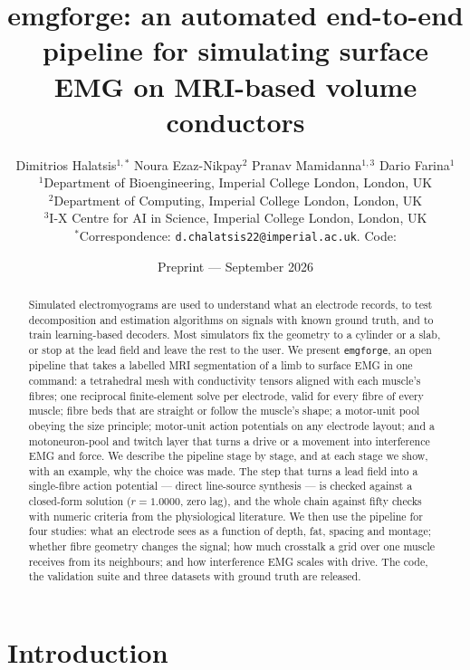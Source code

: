 \documentclass[11pt,a4paper]{article}
\title{\textbf{emgforge}: an automated end-to-end pipeline for simulating surface EMG on MRI-based volume conductors}
\author{Dimitrios Halatsis$^{1,*}$ \quad Noura Ezaz-Nikpay$^{2}$ \quad Pranav Mamidanna$^{1,3}$ \quad Dario Farina$^{1}$\\[6pt]
  \small $^{1}$Department of Bioengineering, Imperial College London, London, UK\\
  \small $^{2}$Department of Computing, Imperial College London, London, UK\\
  \small $^{3}$I-X Centre for AI in Science, Imperial College London, London, UK\\[4pt]
  \small $^{*}$Correspondence: \texttt{d.chalatsis22@imperial.ac.uk}. Code: \repo}
\date{Preprint --- September 2026}
\newcommand{\emgforge}{\texttt{emgforge}}
\begin{document}
\maketitle

\begin{abstract}
Simulated electromyograms are used to understand what an electrode records, to test
decomposition and estimation algorithms on signals with known ground truth, and to train
learning-based decoders. Most simulators fix the geometry to a cylinder or a slab, or stop
at the lead field and leave the rest to the user. We present \emgforge{}, an open pipeline
that takes a labelled MRI segmentation of a limb to surface EMG in one command: a
tetrahedral mesh with conductivity tensors aligned with each muscle's fibres; one
reciprocal finite-element solve per electrode, valid for every fibre of every muscle;
fibre beds that are straight or follow the muscle's shape; a motor-unit pool obeying the
size principle; motor-unit action potentials on any electrode layout; and a
motoneuron-pool and twitch layer that turns a drive or a movement into interference EMG
and force. We describe the pipeline stage by stage, and at each stage we show, with an
example, why the choice was made. The step that turns a lead field into a single-fibre
action potential --- direct line-source synthesis --- is checked against a closed-form
solution ($r = 1.0000$, zero lag), and the whole chain against fifty checks with numeric
criteria from the physiological literature. We then use the pipeline for four studies: what
an electrode sees as a function of depth, fat, spacing and montage; whether fibre
geometry changes the signal; how much crosstalk a grid over one muscle receives from its
neighbours; and how interference EMG scales with drive. The code, the validation suite and
three datasets with ground truth are released.
\end{abstract}

\section{Introduction}
\label{sec:intro}
\end{document}
